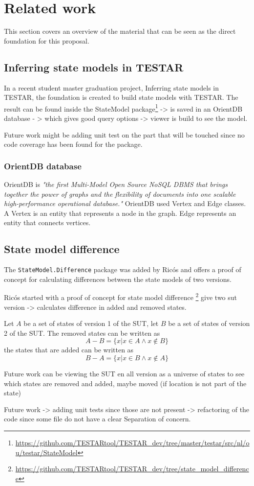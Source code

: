 \section{Related work} \label{releatedWork}

This section covers an overview of the material that can be seen as the direct foundation for this proposal.

\subsection{Inferring state models in TESTAR}

In a recent student master graduation project, Inferring state models in TESTAR, \cite{thesisMulders}  the foundation is created to build state models with TESTAR. The result can be found inside the StateModel package\footnote{\url{https://github.com/TESTARtool/TESTAR_dev/tree/master/testar/src/nl/ou/testar/StateModel}}
-> is saved in an OrientDB database - > which gives good query options -> viewer is build to see the model. 

Future work might be adding unit test on the part that will be touched since no code coverage has been found for the package.

\subsubsection{OrientDB database}

OrientDB is \textit{"the first Multi-Model Open Source NoSQL DBMS that brings together the power of graphs and the flexibility of documents into one scalable high-performance operational database."} \cite{orientdb1} 
OrientDB used Vertex and Edge classes. A Vertex is an entity that represents a node in the graph. Edge represents an entity that connects vertices. 


\subsection{State model difference}
The \verb|StateModel.Difference| package was added by Ricós\cite{stateDiff} and offers a proof of concept for calculating differences between the state models of two versions. 

Ricós started with a proof of concept for state model difference \footnote{\url{https://github.com/TESTARtool/TESTAR_dev/tree/state_model_difference}}
give two sut version -> calculates difference in added and removed states.

Let $A$ be a set of states of version 1 of the SUT, let $B$ be a set of states of version 2 of the SUT. The removed states can be written as
\[A-B = \lbrace x | x \in A \wedge x \notin B \rbrace\]
the states that are added can be written as
\[B-A = \lbrace x | x \in B \wedge x \notin A \rbrace\]

Future work can be viewing the SUT en all version as a universe of states to see which states are removed and added, maybe moved (if location is not part of the state)

Future work -> adding unit tests since those are not present -> refactoring of the code since some file do not have a clear Separation of concern.